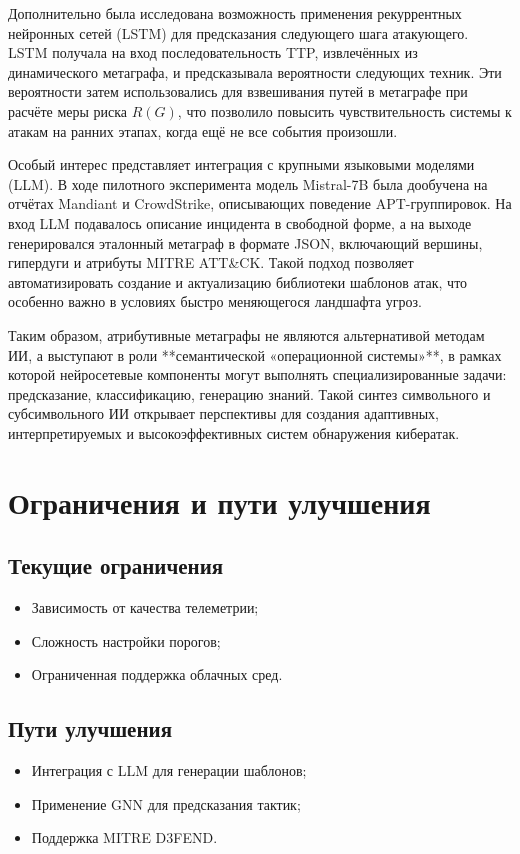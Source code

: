 Дополнительно была исследована возможность применения рекуррентных нейронных сетей (LSTM) для предсказания следующего шага атакующего. LSTM получала на вход последовательность TTP, извлечённых из динамического метаграфа, и предсказывала вероятности следующих техник. Эти вероятности затем использовались для взвешивания путей в метаграфе при расчёте меры риска $R(G)$, что позволило повысить чувствительность системы к атакам на ранних этапах, когда ещё не все события произошли.

Особый интерес представляет интеграция с крупными языковыми моделями (LLM). В ходе пилотного эксперимента модель Mistral-7B была дообучена на отчётах Mandiant и CrowdStrike, описывающих поведение APT-группировок. На вход LLM подавалось описание инцидента в свободной форме, а на выходе генерировался эталонный метаграф в формате JSON, включающий вершины, гипердуги и атрибуты MITRE ATT\&CK. Такой подход позволяет автоматизировать создание и актуализацию библиотеки шаблонов атак, что особенно важно в условиях быстро меняющегося ландшафта угроз.

Таким образом, атрибутивные метаграфы не являются альтернативой методам ИИ, а выступают в роли **семантической «операционной системы»**, в рамках которой нейросетевые компоненты могут выполнять специализированные задачи: предсказание, классификацию, генерацию знаний. Такой синтез символьного и субсимвольного ИИ открывает перспективы для создания адаптивных, интерпретируемых и высокоэффективных систем обнаружения кибератак.

\section{Ограничения и пути улучшения}

\subsection{Текущие ограничения}
\begin{itemize} 
    \item Зависимость от качества телеметрии;
    \item Сложность настройки порогов;
    \item Ограниченная поддержка облачных сред.
\end{itemize}
\subsection{Пути улучшения}
\begin{itemize}
    \item Интеграция с LLM для генерации шаблонов;
    \item Применение GNN для предсказания тактик;
    \item Поддержка MITRE D3FEND.
\end{itemize}   